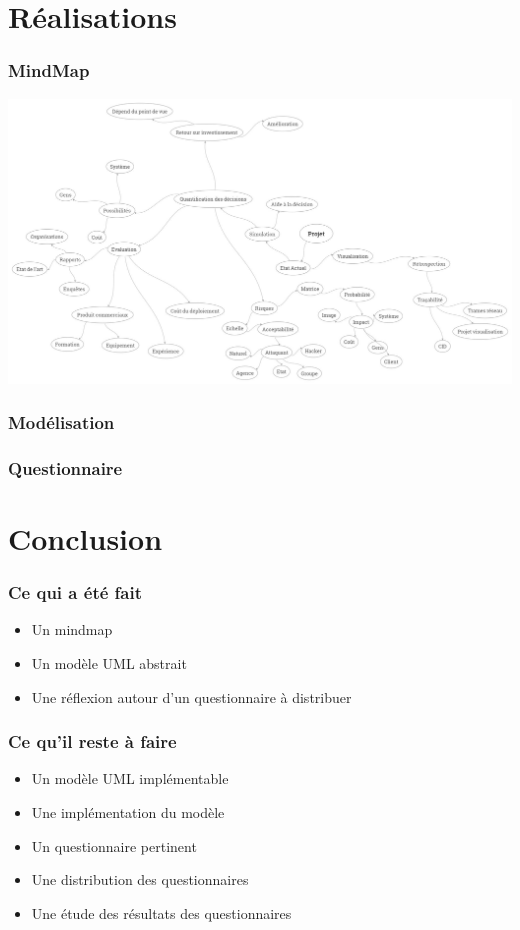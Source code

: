 \documentclass{beamer}
\begin{document}
  \section{Réalisations}
  \begin{frame}
   \frametitle{MindMap}
   \begin{center}
    \includegraphics[scale=0.15]{mindmap.jpg}
   \end{center}
  \end{frame}
  
  \begin{frame}
   \frametitle{Modélisation}
  \end{frame}
  
  \begin{frame}
   \frametitle{Questionnaire}
  \end{frame}

  \section{Conclusion}
  \begin{frame}
   \frametitle{Ce qui a été fait} 
   \begin{itemize}
    \item Un mindmap
    \item Un modèle UML abstrait
    \item Une réflexion autour d'un questionnaire à distribuer
   \end{itemize}
  \end{frame}
  
  \begin{frame}
   \frametitle{Ce qu'il reste à faire}
   \begin{itemize}
    \item Un modèle UML implémentable
    \item Une implémentation du modèle
    \item Un questionnaire pertinent
    \item Une distribution des questionnaires
    \item Une étude des résultats des questionnaires
   \end{itemize}
  \end{frame}
  
\end{document}
